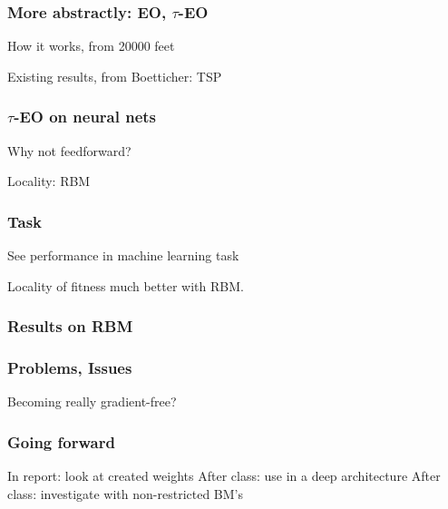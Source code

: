 \documentclass{beamer}
\begin{document}
\begin{frame}
  \frametitle{More abstractly: EO, $\tau$-EO}
  How it works, from 20000 feet

  Existing results, from Boetticher: TSP
\end{frame}

\begin{frame}
  \frametitle{$\tau$-EO on neural nets}
  Why not feedforward?

  Locality: RBM

\end{frame}


\begin{frame}
  \frametitle{Task}
  See performance in machine learning task

  Locality of fitness much better with RBM.
\end{frame}

\begin{frame}
  \frametitle{Results on RBM}
\end{frame}

\begin{frame}
  \frametitle{Problems, Issues}
  Becoming really gradient-free?

\end{frame}

\begin{frame}
  \frametitle{Going forward}
  In report: look at created weights
  After class: use in a deep architecture
  After class: investigate with non-restricted BM's
\end{frame}
\end{document}
